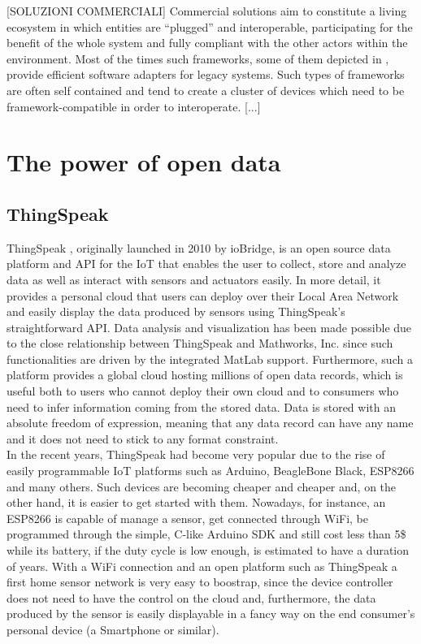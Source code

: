 \documentclass[a4paper,10pt]{article}
\begin{document}
[SOLUZIONI COMMERCIALI]
Commercial solutions aim to constitute a living ecosystem in which entities are ``plugged'' and interoperable, participating for the benefit of the whole system and fully compliant with the other actors within the environment.
Most of the times such frameworks, some of them depicted in \cite{derhamy2015survey}, provide efficient software adapters for legacy systems.
Such types of frameworks are often self contained and tend to create a cluster of devices which need to be framework-compatible in order to interoperate.
[...]








\section{The power of open data}
\subsection*{ThingSpeak}
ThingSpeak \cite{thingspeak}, originally launched in 2010 by ioBridge, is an open source data platform and API for the IoT that enables the user to collect, store and analyze data as well as interact with sensors and actuators easily.
In more detail, it provides a personal cloud that users can deploy over their Local Area Network and easily display the data produced by sensors using ThingSpeak's straightforward API.
Data analysis and visualization has been made possible due to the close relationship between ThingSpeak and Mathworks, Inc. since such functionalities are driven by the integrated MatLab support. 
Furthermore, such a platform provides a global cloud hosting millions of open data records, which is useful both to users who cannot deploy their own cloud and to consumers who need to infer information coming from the stored data.
Data is stored with an absolute freedom of expression, meaning that any data record can have any name and it does not need to stick to any format constraint.
\\

In the recent years, ThingSpeak had become very popular due to the rise of easily programmable IoT platforms such as Arduino, BeagleBone Black, ESP8266 and many others.
Such devices are becoming cheaper and cheaper and, on the other hand, it is easier to get started with them.
Nowadays, for instance, an ESP8266 is capable of manage a sensor, get connected through WiFi, be programmed through the simple, C-like Arduino SDK and still cost less than 5\$ while its battery, if the duty cycle is low enough, is estimated to have a duration of years.
With a WiFi connection and an open platform such as ThingSpeak a first home sensor network is very easy to boostrap, since the device controller does not need to have the control on the cloud and, furthermore, the data produced by the sensor is easily displayable in a fancy way on the end consumer's personal device (a Smartphone or similar).
\end{document}
